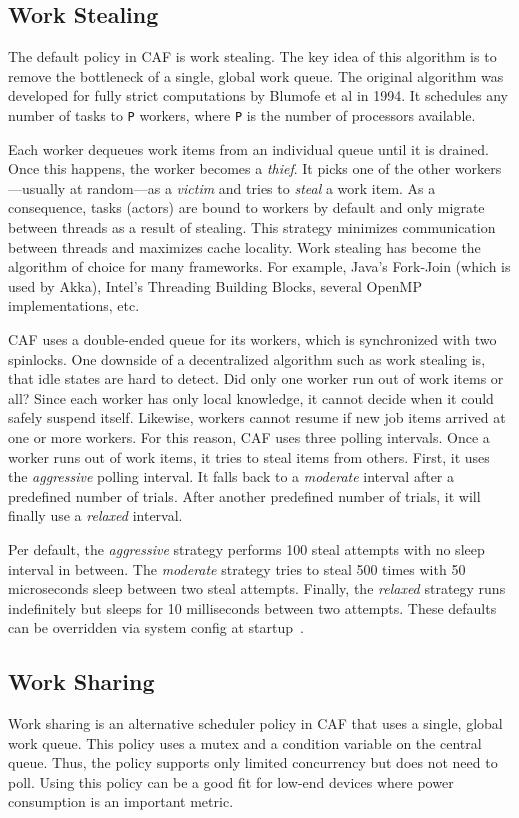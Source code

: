 \subsection{Work Stealing}
\label{work-stealing}

The default policy in CAF is work stealing. The key idea of this algorithm is
to remove the bottleneck of a single, global work queue.  The original
algorithm was developed for fully strict computations by Blumofe et al in 1994.
It schedules any number of tasks to \lstinline^P^ workers, where \lstinline^P^
is the number of processors available.


Each worker dequeues work items from an individual queue until it is drained.
Once this happens, the worker becomes a \emph{thief}. It picks one of the other
workers---usually at random---as a \emph{victim} and tries to \emph{steal} a
work item. As a consequence, tasks (actors) are bound to workers by default and
only migrate between threads as a result of stealing. This strategy minimizes
communication between threads and maximizes cache locality. Work stealing has
become the algorithm of choice for many frameworks. For example, Java's
Fork-Join (which is used by Akka), Intel's Threading Building Blocks, several
OpenMP implementations, etc.

CAF uses a double-ended queue for its workers, which is synchronized with two
spinlocks. One downside of a decentralized algorithm such as work stealing is,
that idle states are hard to detect. Did only one worker run out of work items
or all? Since each worker has only local knowledge, it cannot decide when it
could safely suspend itself. Likewise, workers cannot resume if new job items
arrived at one or more workers. For this reason, CAF uses three polling
intervals. Once a worker runs out of work items, it tries to steal items from
others. First, it uses the \emph{aggressive} polling interval. It falls back to
a \emph{moderate} interval after a predefined number of trials. After another
predefined number of trials, it will finally use a \emph{relaxed} interval.

Per default, the \emph{aggressive} strategy performs 100 steal attempts with no
sleep interval in between. The \emph{moderate} strategy tries to steal 500
times with 50 microseconds sleep between two steal attempts. Finally, the
\emph{relaxed} strategy runs indefinitely but sleeps for 10 milliseconds
between two attempts. These defaults can be overridden via system config at
startup~.

\subsection{Work Sharing}
\label{work-sharing}

Work sharing is an alternative scheduler policy in CAF that uses a single,
global work queue. This policy uses a mutex and a condition variable on the
central queue. Thus, the policy supports only limited concurrency but does not
need to poll. Using this policy can be a good fit for low-end devices where
power consumption is an important metric.

